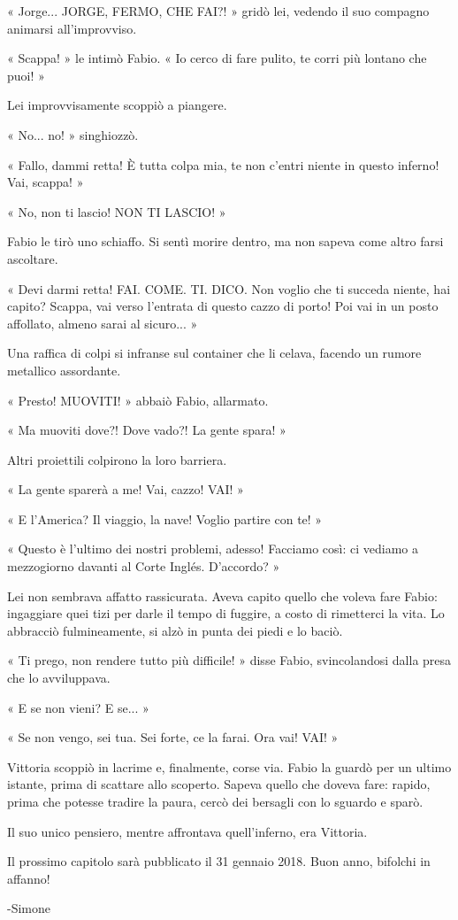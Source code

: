 « Jorge... JORGE, FERMO, CHE FAI?! » gridò lei, vedendo il suo compagno animarsi all'improvviso.

« Scappa! » le intimò Fabio. « Io cerco di fare pulito, te corri più lontano che puoi! »

Lei improvvisamente scoppiò a piangere.

« No... no! » singhiozzò.

« Fallo, dammi retta! È tutta colpa mia, te non c'entri niente in questo inferno! Vai, scappa! »

« No, non ti lascio! NON TI LASCIO! »

Fabio le tirò uno schiaffo. Si sentì morire dentro, ma non sapeva come altro farsi ascoltare.

« Devi darmi retta! FAI. COME. TI. DICO. Non voglio che ti succeda niente, hai capito? Scappa, vai verso l'entrata di questo cazzo di porto! Poi vai in un posto affollato, almeno sarai al sicuro... »

Una raffica di colpi si infranse sul container che li celava, facendo un rumore metallico assordante.

« Presto! MUOVITI! » abbaiò Fabio, allarmato.

« Ma muoviti dove?! Dove vado?! La gente spara! »

Altri proiettili colpirono la loro barriera.

« La gente sparerà a me! Vai, cazzo! VAI! »

« E l'America? Il viaggio, la nave! Voglio partire con te! »

« Questo è l'ultimo dei nostri problemi, adesso! Facciamo così: ci vediamo a mezzogiorno davanti al Corte Inglés. D'accordo? »

Lei non sembrava affatto rassicurata. Aveva capito quello che voleva fare Fabio: ingaggiare quei tizi per darle il tempo di fuggire, a costo di rimetterci la vita. Lo abbracciò fulmineamente, si alzò in punta dei piedi e lo baciò.

« Ti prego, non rendere tutto più difficile! » disse Fabio, svincolandosi dalla presa che lo avviluppava.

« E se non vieni? E se... »

« Se non vengo, sei tua. Sei forte, ce la farai. Ora vai! VAI! »

Vittoria scoppiò in lacrime e, finalmente, corse via. Fabio la guardò per un ultimo istante, prima di scattare allo scoperto. Sapeva quello che doveva fare: rapido, prima che potesse tradire la paura, cercò dei bersagli con lo sguardo e sparò.

Il suo unico pensiero, mentre affrontava quell'inferno, era Vittoria.

Il prossimo capitolo sarà pubblicato il 31 gennaio 2018. Buon anno, bifolchi in affanno!

-Simone



